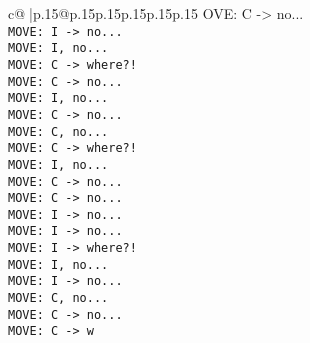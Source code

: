 \documentclass{article}
\begin{document}
{\begin{supertabular}{c@{$\;$}|p{.15\linewidth}@{}p{.15\linewidth}p{.15\linewidth}p{.15\linewidth}p{.15\linewidth}p{.15\linewidth}}
{{{OVE: C -> no...\\ \tt  MOVE: I -> no...\\ \tt  MOVE: I, no...\\ \tt  MOVE: C -> where?!\\ \tt  MOVE: C -> no...\\ \tt  MOVE: I, no...\\ \tt  MOVE: C -> no...\\ \tt  MOVE: C, no...\\ \tt  MOVE: C -> where?!\\ \tt  MOVE: I, no...\\ \tt  MOVE: C -> no...\\ \tt  MOVE: C -> no...\\ \tt  MOVE: I -> no...\\ \tt  MOVE: I -> no...\\ \tt  MOVE: I -> where?!\\ \tt  MOVE: I, no...\\ \tt  MOVE: I -> no...\\ \tt  MOVE: C, no...\\ \tt  MOVE: C -> no...\\ \tt  MOVE: C -> w}}}
\end{supertabular}}
\end{document}
